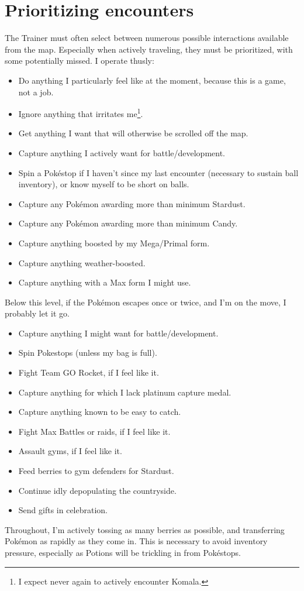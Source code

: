 \section{Prioritizing encounters}
\label{sec:prioritymap}
The Trainer must often select between numerous possible interactions available from the map.
Especially when actively traveling, they must be prioritized, with some potentially missed.
I operate thusly:
\begin{itemize}
\item Do anything I particularly feel like at the moment, because this is a game, not a job.
\item Ignore anything that irritates me\footnote{I expect never again to actively encounter Komala.}.
\item Get anything I want that will otherwise be scrolled off the map.
\item Capture anything I actively want for battle/development.
\item Spin a Pokéstop if I haven't since my last encounter (necessary to sustain ball inventory),
       or know myself to be short on balls.
\item Capture any Pokémon awarding more than minimum Stardust.
\item Capture any Pokémon awarding more than minimum Candy.
\item Capture anything boosted by my Mega/Primal form.
\item Capture anything weather-boosted.
\item Capture anything with a Max form I might use.
\end{itemize}
Below this level, if the Pokémon escapes once or twice, and I'm on the move,
I probably let it go.
\begin{itemize}
\item Capture anything I might want for battle/development.
\item Spin Pokestops (unless my bag is full).
\item Fight Team GO Rocket, if I feel like it.
\item Capture anything for which I lack platinum capture medal.
\item Capture anything known to be easy to catch.
\item Fight Max Battles or raids, if I feel like it.
\item Assault gyms, if I feel like it.
\item Feed berries to gym defenders for Stardust.
\item Continue idly depopulating the countryside.
\item Send gifts in celebration.
\end{itemize}
Throughout, I'm actively tossing as many berries as possible, and
 transferring Pokémon as rapidly as they come in.
This is necessary to avoid inventory pressure, especially as
 Potions will be trickling in from Pokéstops.

